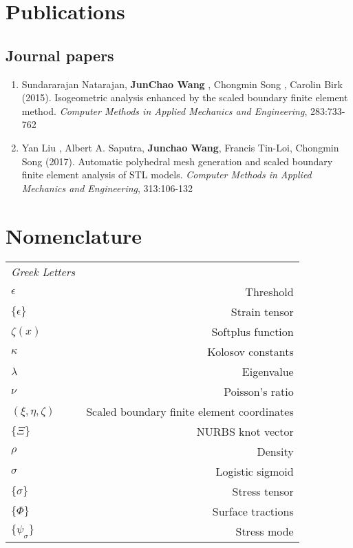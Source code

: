 
\chapter*{Publications}
\section*{Journal papers}
\begin{enumerate}
    \item Sundararajan Natarajan, \textbf{JunChao Wang} , Chongmin Song , Carolin Birk (2015).
    Isogeometric analysis enhanced by the scaled boundary finite element method.
    \textit{Computer Methods in Applied Mechanics and Engineering}, 283:733-762
    \item Yan Liu , Albert A. Saputra, \textbf{Junchao Wang}, Francis Tin-Loi, Chongmin Song (2017).
    Automatic polyhedral mesh generation and scaled boundary finite element analysis of STL models.
    \textit{Computer Methods in Applied Mechanics and Engineering}, 313:106-132
\end{enumerate}


\chapter*{Nomenclature}
\renewcommand{\arraystretch}{2}
\begin{table}[h!]
\begin{tabular}{lr}
    {\it Greek Letters}     &   \\
    $\epsilon$              &   Threshold   \\
    $\{ \epsilon \}$        &   Strain tensor   \\
    $\zeta(x)$              &   Softplus function   \\
    $\kappa$                &   Kolosov constants   \\
    $\lambda$               &   Eigenvalue  \\
    $\nu$                   &   Poisson's ratio \\
    $( \xi, \eta, \zeta )$  &   Scaled boundary finite element coordinates  \\
    $\{ \Xi \}$             &   NURBS knot vector   \\
    $\rho$                  &   Density \\
    $\sigma$                &   Logistic sigmoid    \\
    $\{ \sigma \}$          &   Stress tensor   \\
    $\{ \Phi \}$            &   Surface tractions   \\
    $\{ \psi_\sigma \}$     &   Stress mode \\
\end{tabular}
\end{table}
\pagebreak
\renewcommand{\arraystretch}{1.4}

